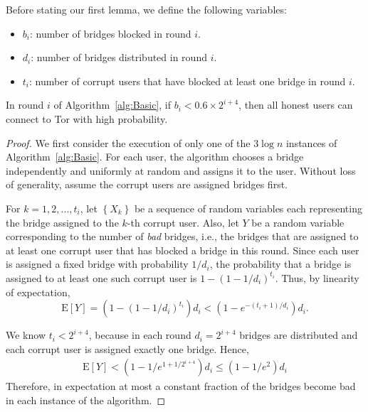 \documentclass{llncs}
\newcommand{\ie}{i.e.}
\newcommand{\E}{\mathbf{\mathrm{E}}}
\newcommand{\jared}[1]{}
\newcommand{\sfsize}{\fontsize{0.73\baselineskip}{0.73\baselineskip}\selectfont}
\newcommand{\sans}[1]{\textsf{\sfsize \mbox{#1}}}
\newcommand{\sansb}[1]{\textbf{\sans{\mbox{#1}}}}
\begin{document}
Before stating our first lemma, we define the following variables:
\begin{itemize}
	\item $b_i$: number of bridges blocked in round $i$.	
	\item $d_i$: number of bridges distributed in round $i$.
	\item $t_i$: number of corrupt users that have blocked at least one bridge in round $i$.
\end{itemize}

\begin{lemma}[\sansb{Robustness}] \label{lem:robustness}
	In round $i$ of Algorithm~\ref{alg:Basic}, if ${b_i < 0.6 \times 2^{i+4}}$, then all honest users can connect to Tor with high probability.
\end{lemma}
\begin{proof}
	We first consider the execution of only one of the $3\log{n}$ instances of Algorithm~\ref{alg:Basic}. For each user, the algorithm chooses a bridge independently and uniformly at random and assigns it to the user. Without loss of generality, assume the corrupt users are assigned bridges first.
	
	For ${k=1,2,...,t_i}$, let $\left\{X_k\right\}$ be a sequence of random variables each representing the bridge assigned to the $k$-th corrupt user. Also, let $Y$ be a random variable corresponding to the number of \emph{bad} bridges, \ie, the bridges that are assigned to at least one corrupt user that has blocked a bridge in this round.  Since each user is assigned a fixed bridge with probability $1/d_i$, the probability that a bridge is assigned to at least one such corrupt user is ${1-(1-1/d_i)^{t_i}}$.  Thus, by linearity of expectation,
	\[\E[Y] = \left(1 - \left(1-1/d_i\right)^{t_i}\right)d_i < (1 - e^{-(t_i+1)/d_i})d_i.\]
	
	We know ${t_i < 2^{i+4}}$, because in each round ${d_i = 2^{i+4}}$ bridges are distributed and each corrupt user is assigned exactly one bridge. \jared{This is confusing.  You say that Y is the number of bridges assigned to at least one corrupt user, but then you use $t_i$ here which only counts the number of corrupt users that have *blocked* bridges.} Hence, 
	\begin{align}
	\E[Y] < (1 - 1/e^{1+1/2^{i+4}})d_i \leq (1 - 1/e^2)d_i \label{eq:expectedBounds}
	\end{align}
	Therefore, in expectation at most a constant fraction of the bridges become bad in each instance of the algorithm. 
	

\end{proof}
\end{document}
